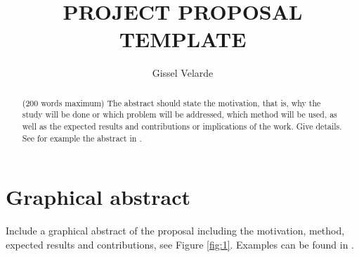 \documentclass[11pt,a4paper]{article}
\title{PROJECT PROPOSAL TEMPLATE}
\author{ Gissel Velarde }
\begin{document}
\maketitle	

 \tableofcontents
 \pagebreak
\begin{abstract}
(200 words maximum) The abstract should state the motivation, that is, why the study will be done or which problem will be addressed, which method will be used, as well as the expected results and contributions or implications of the work. Give details. See for example the abstract in \cite{krizhevsky2017imagenet}.
\end{abstract}


\section{Graphical abstract}
Include a graphical abstract of the proposal including the motivation, method, expected results and contributions, see Figure \ref{fig:1}. Examples can be found in . 
\end{document}

